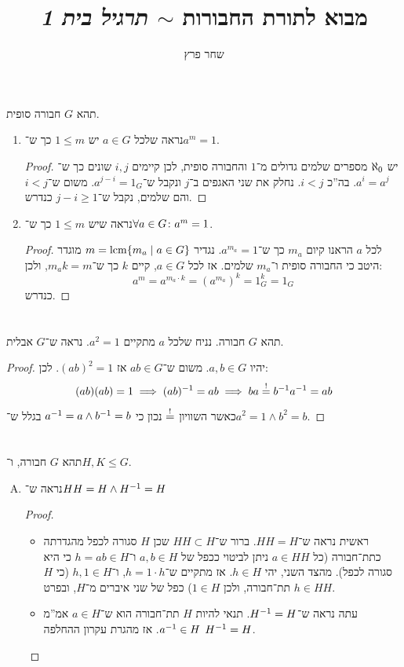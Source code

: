 \documentclass[]{../../../../../tex/classes/homework}
\author{שחר פרץ}
\title{מבוא לתורת החבורות $\sim$ \textit{תרגיל בית 1}}
\begin{document}
	\maketitle
	\section{}
	תהא $G$ חבורה סופית. 
	\begin{enumerate}
		\item נראה שלכל $a \in G$ יש $1 \le m$ כך ש־$a^{m} = 1$. \begin{proof}
			יש $\aleph_0$ מספרים שלמים גדולים מ־$1$ והחבורה סופית, לכן קיימים $i, j$ שונים כך ש־$a^{i} = a^{j}$. בה''כ $i < j$. נחלק את שני האגפים ב־$j$ ונקבל ש־$a^{j - i} = 1_G$. משום ש־$i < j$ והם שלמים, נקבל ש־$j - i \ge 1$ כנדרש. 
		\end{proof}
		\item נראה שיש $1 \le m$ כך ש־$\forall a \in G \colon a^{m} =1$. \begin{proof}
			לכל $a$ הראנו קיום $m_a$ כך ש־$a^{m_a} = 1$. נגדיר $m = \operatorname{lcm}\{m_a \mid a \in G\}$ מוגדר היטב כי החבורה סופית ו־$m_a$ שלמים. אז לכל $a \in G$, קיים $k$ כך ש־$m_a k = m$, ולכן: 
			\[ a^{m} = a^{m_a \cdot k} = (a^{m_a})^{k} = 1_G^{k} = 1_G \]
			כנדרש. 
		\end{proof}
	\end{enumerate}
	
	\section{}
	תהא $G$ חבורה. נניח שלכל $a$ מתקיים $a^{2} = 1$. נראה ש־$G$ אבלית. \begin{proof}
		יהיו $a, b \in G$. משום ש־$ab \in G$ אז $(ab)^{2} = 1$. לכן: 
		\[ (ab)(ab) = 1 \implies (ab)^{-1} = ab \implies ba \overset{!}{=} b^{-1} a^{-1} = ab \]
		כאשר השוויון $\overset{!}{=}$ נכון כי $a^{-1} = a \land b^{-1} = b$ בגלל ש־$a^{2} = 1 \land b^{2} = b$. 
	\end{proof}
	
	\section{}
	תהא $G$ חבורה, ו־$H, K \le G$. 
	\begin{enumerate}[(A)]
		\item נראה ש־$HH = H \land H^{-1} = H$\begin{proof}
			\begin{itemize}
				\item ראשית נראה ש־$HH = H$. ברור ש־$HH \subset H$ שכן $H$ סגורה לכפל מהגדרתה כתת־חבורה (כל $a \in HH$ ניתן לביטוי ככפל של $a, b \in H$ ו־$h = ab \in H$ כי היא סגורה לכפל). מהצד השני, יהי $h \in H$. אז מתקיים ש־$h = 1 \cdot h$, ו־$h, 1 \in H$ (כי $H$ תת־חבורה, ולכן $1 \in H$) כפל של שני איברים מ־$H$, ובפרט $h \in HH$. 
				\item עתה נראה ש־$H^{-1} = H$. תנאי להיות $H$ תת־חבורה הוא ש־$a \in H$ אמ''מ $a ^{-1} \in H$. אז מהגרת עקרון ההחלפה $H^{-1} = H$. 
			\end{itemize}
		\end{proof}
	\end{enumerate}
	
\end{document}
